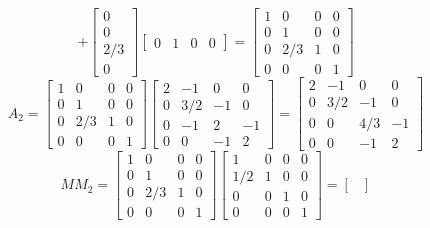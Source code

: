 \begin{itemize}
\[  			+
  			\begin{bmatrix}
   			 0 \\ 
    		 0 \\
    		 2/3 \\
    		 0  
  			\end{bmatrix}
  			\begin{bmatrix}
   			 0 & 1 & 0 & 0 
  			\end{bmatrix}
  			=
  			\begin{bmatrix}
   			 1 & 0 & 0 & 0 \\ 
    		 0 & 1 & 0 & 0 \\
    		 0 & 2/3 & 1 & 0 \\
    		 0 & 0 & 0 & 1  
  			\end{bmatrix}
  			\]
  			\[ A_{2} = 
  			\begin{bmatrix}
   			 1 & 0 & 0 & 0 \\ 
    		 0 & 1 & 0 & 0 \\
    		 0 & 2/3 & 1 & 0 \\
    		 0 & 0 & 0 & 1  
  			\end{bmatrix}
			\begin{bmatrix}
    		2 & -1 & 0 & 0 \\
    		0 & 3/2 & -1 & 0 \\
    		0 & -1 & 2 & -1 \\
    		0 & 0 & -1 & 2  
  			\end{bmatrix}
  			=
  			\begin{bmatrix}
    		2 & -1 & 0 & 0 \\
    		0 & 3/2 & -1 & 0 \\
    		0 & 0 & 4/3 & -1 \\
    		0 & 0 & -1 & 2  
  			\end{bmatrix}
  			\]
  			\[ MM_{2} = 
  			\begin{bmatrix}
   			 1 & 0 & 0 & 0 \\ 
    		 0 & 1 & 0 & 0 \\
    		 0 & 2/3 & 1 & 0 \\
    		 0 & 0 & 0 & 1  
  			\end{bmatrix}
  			\begin{bmatrix}
   			 1 & 0 & 0 & 0 \\ 
    		 1/2 & 1 & 0 & 0 \\
    		 0 & 0 & 1 & 0 \\
    		 0 & 0 & 0 & 1  
  			\end{bmatrix}
  			= 
  			\begin{bmatrix}

\end{bmatrix}\]
\end{itemize}
